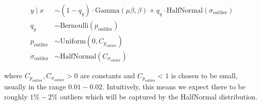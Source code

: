 \documentclass[a4paper,12pt]{article}
\begin{document}
\begin{align*}
    y \mid x &\sim \left(1 - q_y\right)\cdot\text{Gamma}\left(\mu\beta, \beta\right) + q_y \cdot \text{HalfNormal}\left(\sigma_{\text{outlier}}\right) \tag{4.2.5} \\
    q_y &\sim \text{Bernoulli}\left(p_{\text{outlier}}\right) \tag{4.2.6} \\
    p_{\text{outlier}} &\sim \text{Uniform}\left(0, C_{p_{\text{outlier}}}\right) \tag{4.2.7} \\
    \sigma_{\text{outlier}} &\sim \text{HalfNormal}\left(C_{\sigma_{\text{outlier}}}\right) \tag{4.2.8}
\end{align*}

where $C_{p_{\text{outlier}}}, C_{\sigma_{\text{outlier}}} > 0$ are constants and $C_{p_{\text{outlier}}} < 1$ is chosen to be small, usually in the range $0.01 - 0.02$. Intuitively, this means we expect there to be roughly $1\% - 2\%$ outliers which will be captured by the HalfNormal distribution.
\end{document}
